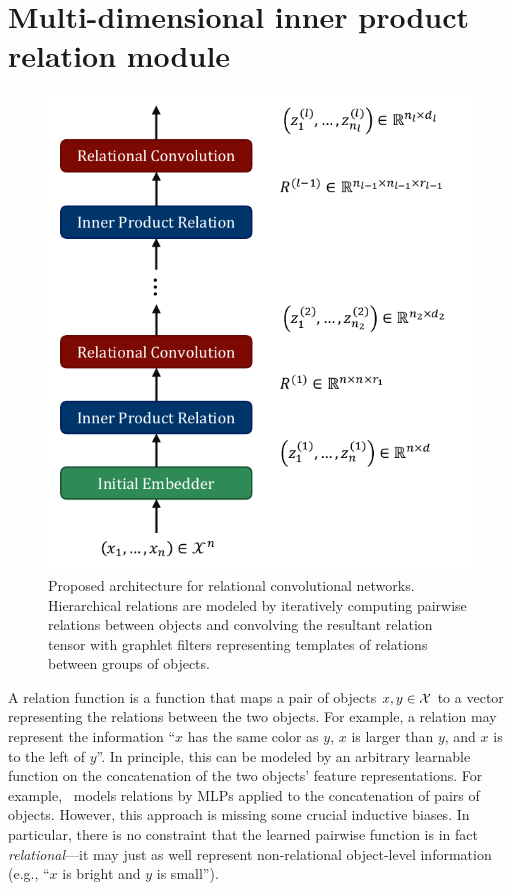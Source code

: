 \section{Multi-dimensional inner product relation module}\label{sec:mdipr}

\begin{figure}
    \centering
    \includegraphics[width=.48\textwidth]{figs/relconv_architecture.pdf}
    \caption{Proposed architecture for relational convolutional networks. Hierarchical relations are modeled by iteratively computing pairwise relations between objects and convolving the resultant relation tensor with graphlet filters representing templates of relations between groups of objects.
    }\label{fig:relconv_architecture}
\end{figure}

A relation function is a function that maps a pair of objects $x, y \in {\mathcal{X}}$ to a vector representing the relations between the two objects. For example, a relation may represent the information ``$x$ has the same color as $y$, $x$ is larger than $y$, and $x$ is to the left of $y$''. In principle, this can be modeled by an arbitrary learnable function on the concatenation of the two objects' feature representations. For example,~\citet{santoroSimpleNeural2017} models relations by MLPs applied to the concatenation of pairs of objects. However, this approach is missing some crucial inductive biases. In particular, there is no constraint that the learned pairwise function is in fact \textit{relational}---it may just as well represent non-relational object-level information (e.g., ``$x$ is bright and $y$ is small'').%

